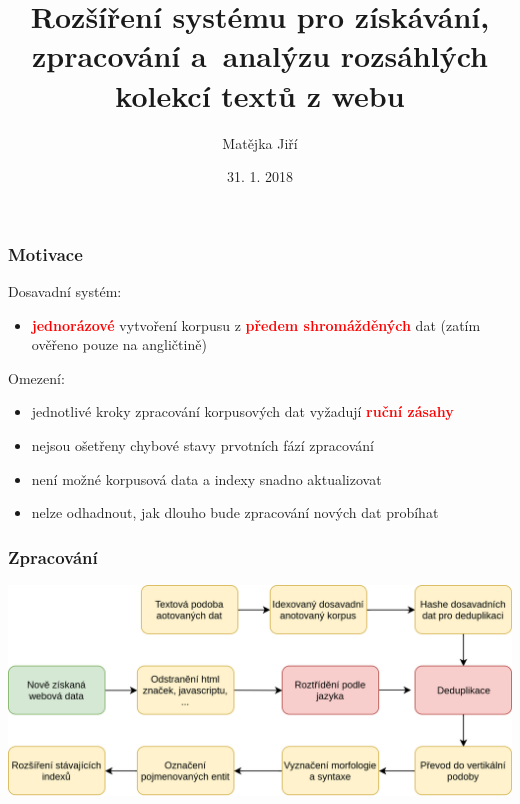 \documentclass{beamer}
\title[Prezentace k předmětu Semestrální projekt]{Rozšíření systému pro získávání, zpracování a~analýzu rozsáhlých kolekcí textů z webu}
\author{Matějka Jiří}
\date{31. 1. 2018}
\newcommand\br[1]{\textcolor{red}{\textbf{#1}}}
\begin{document}
  \frame{\titlepage}
  \begin{frame}
    \frametitle{Motivace}
	Dosavadní systém:
	\begin{itemize}
		\item \br{jednorázové} vytvoření korpusu z \br{předem shromážděných} dat (zatím ověřeno pouze na angličtině)
	\end{itemize}
	Omezení:
	\begin{itemize}
		\item jednotlivé kroky zpracování korpusových dat vyžadují \br{ruční zásahy}
		\item nejsou ošetřeny chybové stavy prvotních fází zpracování
		\item není možné korpusová data a indexy snadno aktualizovat
		\item nelze odhadnout, jak dlouho bude zpracování nových dat probíhat
	\end{itemize}
  \end{frame}
  \begin{frame}
    \frametitle{Zpracování}
	\includegraphics[width=\linewidth]{pipeline.png}
  \end{frame}
\end{document}
